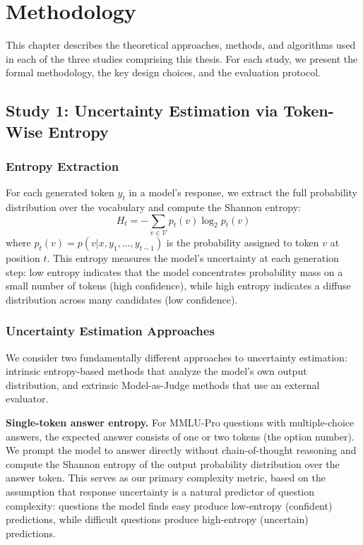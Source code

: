\chapter{Methodology}

This chapter describes the theoretical approaches, methods, and algorithms used in each of the three studies comprising this thesis. For each study, we present the formal methodology, the key design choices, and the evaluation protocol.

\section{Study 1: Uncertainty Estimation via Token-Wise Entropy}

\subsection{Entropy Extraction}

For each generated token $y_t$ in a model's response, we extract the full probability distribution over the vocabulary and compute the Shannon entropy:
\begin{equation}
    H_t = -\sum_{v \in \mathcal{V}} p_t(v) \log_2 p_t(v)
\end{equation}
where $p_t(v) = p(v | x, y_1, \ldots, y_{t-1})$ is the probability assigned to token $v$ at position $t$. This entropy measures the model's uncertainty at each generation step: low entropy indicates that the model concentrates probability mass on a small number of tokens (high confidence), while high entropy indicates a diffuse distribution across many candidates (low confidence).

\subsection{Uncertainty Estimation Approaches}

We consider two fundamentally different approaches to uncertainty estimation: intrinsic entropy-based methods that analyze the model's own output distribution, and extrinsic Model-as-Judge methods that use an external evaluator.

\textbf{Single-token answer entropy.} For MMLU-Pro questions with multiple-choice answers, the expected answer consists of one or two tokens (the option number). We prompt the model to answer directly without chain-of-thought reasoning and compute the Shannon entropy of the output probability distribution over the answer token. This serves as our primary complexity metric, based on the assumption that response uncertainty is a natural predictor of question complexity: questions the model finds easy produce low-entropy (confident) predictions, while difficult questions produce high-entropy (uncertain) predictions.

